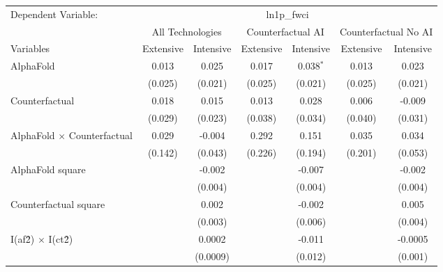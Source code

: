 \begingroup
\centering
\begin{tabular}{lcccccc}
   \tabularnewline \midrule \midrule
   Dependent Variable: & \multicolumn{6}{c}{ln1p\_fwci}\\
 & \multicolumn{2}{c}{All Technologies} & \multicolumn{2}{c}{Counterfactual AI} & \multicolumn{2}{c}{Counterfactual No AI} \\
\cmidrule(lr){1-1}\cmidrule(lr){2-3} \cmidrule(lr){4-5} \cmidrule(lr){6-7}
Variables & \multicolumn{1}{c}{Extensive} & \multicolumn{1}{c}{Intensive} & \multicolumn{1}{c}{Extensive} & \multicolumn{1}{c}{Intensive} & \multicolumn{1}{c}{Extensive} & \multicolumn{1}{c}{Intensive} \\
\cmidrule(lr){1-1}\cmidrule(lr){2-2} \cmidrule(lr){3-3} \cmidrule(lr){4-4} \cmidrule(lr){5-5} \cmidrule(lr){6-6} \cmidrule(lr){7-7}
   AlphaFold                          & 0.013   & 0.025    & 0.017   & 0.038$^{*}$ & 0.013   & 0.023\\   
                                      & (0.025) & (0.021)  & (0.025) & (0.021)     & (0.025) & (0.021)\\   
   Counterfactual                     & 0.018   & 0.015    & 0.013   & 0.028       & 0.006   & -0.009\\   
                                      & (0.029) & (0.023)  & (0.038) & (0.034)     & (0.040) & (0.031)\\   
   AlphaFold $\times$ Counterfactual  & 0.029   & -0.004   & 0.292   & 0.151       & 0.035   & 0.034\\   
                                      & (0.142) & (0.043)  & (0.226) & (0.194)     & (0.201) & (0.053)\\   
   AlphaFold square                   &         & -0.002   &         & -0.007      &         & -0.002\\   
                                      &         & (0.004)  &         & (0.004)     &         & (0.004)\\   
   Counterfactual square              &         & 0.002    &         & -0.002      &         & 0.005\\   
                                      &         & (0.003)  &         & (0.006)     &         & (0.004)\\   
   I(af\^2) $\times$ I(ct\^2)         &         & 0.0002   &         & -0.011      &         & -0.0005\\   
                                      &         & (0.0009) &         & (0.012)     &         & (0.001)\\   

\end{tabular}
